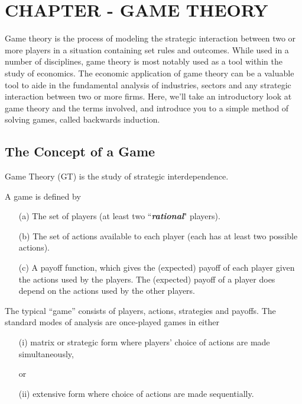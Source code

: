 \documentclass[]{report}
\begin{document}
	

\chapter{CHAPTER - GAME THEORY}


Game theory is the process of modeling the strategic interaction between two or more players in a situation containing set rules and outcomes. While used in a number of disciplines, game theory is most notably used as a tool within the study of economics. The economic application of game theory can be a valuable tool to aide in the fundamental analysis of industries, sectors and any strategic interaction between two or more firms. Here, we'll take an introductory look at game theory and the terms involved, and introduce you to a simple method of solving games, called backwards induction.
\section{The Concept of a Game}
Game Theory (GT) is the study of strategic interdependence. 
\begin{framed}
\noindent A game is defined by
\begin{itemize}
	\item[(a)] The set of players (at least two ``\textbf{\textit{rational}}" players).
	\item[(b)] The set of actions available to each player (each has at least
	two possible actions).
	\item[(c)] A payoff function, which gives the (expected) payoff of each
	player given the actions used by the players. The (expected) payoff
	of a player does depend on the actions used by the other players.
\end{itemize}
\end{framed}
\noindent The typical ``game'' consists of players, actions, strategies and payoffs. The standard modes of analysis are once-played games in either
\begin{enumerate}
	\item[(i)] matrix or strategic form where players' choice of actions are made simultaneously,
	\item[] \hspace*{50mm} or
	\item[(ii)] extensive form where choice of actions are made sequentially.
\end{enumerate}
\end{document}
